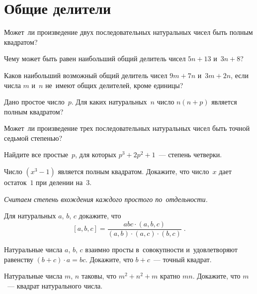 
\section*{Общие делители}


\begin{problems}

Может~ли произведение двух последовательных натуральных чисел быть полным
квадратом?

\item
Чему может быть равен наибольший общий делитель чисел $5 n + 13$ и~$3 n + 8$?

\item
Каков наибольший возможный общий делитель чисел $9 m + 7 n$ и~$3 m + 2 n$,
если числа $m$ и~$n$ не~имеют общих делителей, кроме единицы?

\item
Дано простое число~$p$.
Для каких натуральных~$n$ число $n (n + p)$ является полным квадратом?

\item
Может~ли произведение трех последовательных натуральных чисел быть точной
седьмой степенью?

\item
Найдите все простые~$p$, для которых $p^3 + 2 p^2 + 1$~--- степень четверки.

\item
Число $(x^3 - 1)$ является полным квадратом.
Докажите, что число~$x$ дает остаток~$1$ при делении на~$3$.

\end{problems}

\emph{Считаем степень вхождения каждого простого по~отдельности.}

\begin{problems}

\item
Для натуральных $a$, $b$, $c$ докажите, что
\[
    [a, b, c]
=
    \frac{a b c \cdot (a, b, c)}{(a, b) \cdot (a, c) \cdot (b, c)}
\; . \]

\item
Натуральные числа $a$, $b$, $c$ взаимно просты в~совокупности и~удовлетворяют
равенству $(b + c) \cdot a = b c$.
Докажите, что $b + c$~--- точный квадрат.

\item
Натуральные числа $m$, $n$ таковы, что $m^2 + n^2 + m$ кратно $m n$.
Докажите, что $m$~--- квадрат натурального числа.

\end{problems}

